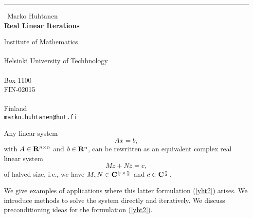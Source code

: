 \documentclass{report}
\begin{document}
\begin{center}
\rule{6in}{1pt} \
{\large Marko Huhtanen \\
{\bf Real Linear Iterations}}

Institute of Mathematics \\ \\ Helsinki University of Techhnology \\ \\ Box 1100 \\ FIN-02015 \\ \\ Finland
\\
{\tt marko.huhtanen@hut.fi}\end{center}

Any linear system
\begin{equation}\label{yht1}
Ax=b,
\end{equation}
with $A\in {\bf R}^{n \times n}$ and $b\in {\bf R}^{n}$,
can be rewritten as an equivalent complex
real linear system
\begin{equation}\label{yht2}
Mz+ N\overline{z}=c,
\end{equation}
of halved size, i.e., we have
$M,N\in {\bf C}^{ \frac{n}{2}\times \frac{n}{2}}$ and $c\in {\bf C}^{\frac{n}{2}}$.

We give examples of
applications where this latter formulation (\ref{yht2}) arises.
We introduce methods to solve the system
directly and iteratively. We discuss preconditioning
ideas for the formulation (\ref{yht2}).
\end{document}

